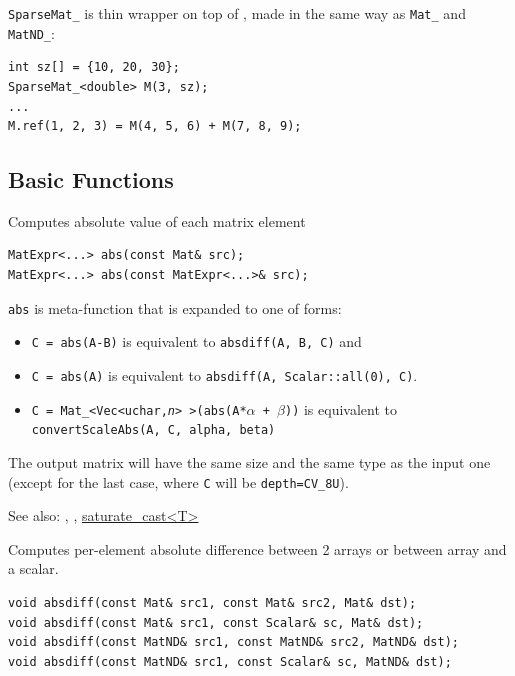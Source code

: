 \texttt{SparseMat\_} is thin wrapper on top of , made in the same way as \texttt{Mat\_} and \texttt{MatND\_}:
\begin{lstlisting}
int sz[] = {10, 20, 30};
SparseMat_<double> M(3, sz);
...
M.ref(1, 2, 3) = M(4, 5, 6) + M(7, 8, 9);
\end{lstlisting}

\subsection{Basic Functions}

\label{abs}
Computes absolute value of each matrix element

\begin{lstlisting}
MatExpr<...> abs(const Mat& src);
MatExpr<...> abs(const MatExpr<...>& src);
\end{lstlisting}
\begin{description}
\end{description}

\texttt{abs} is meta-function that is expanded to one of  forms:

\begin{itemize}
    \item \texttt{C = abs(A-B)} is equivalent to \texttt{absdiff(A, B, C)} and
    \item \texttt{C = abs(A)} is equivalent to \texttt{absdiff(A, Scalar::all(0), C)}.
    \item \texttt{C = Mat\_<Vec<uchar,\emph{n}> >(abs(A*$\alpha$ + $\beta$))} is equivalent to \texttt{convertScaleAbs(A, C, alpha, beta)}
\end{itemize}

The output matrix will have the same size and the same type as the input one
(except for the last case, where \texttt{C} will be \texttt{depth=CV\_8U}).

See also: , , \href{saturate}{saturate\_cast<T>}

\label{absdiff}
Computes per-element absolute difference between 2 arrays or between array and a scalar.

\begin{lstlisting}
void absdiff(const Mat& src1, const Mat& src2, Mat& dst);
void absdiff(const Mat& src1, const Scalar& sc, Mat& dst);
void absdiff(const MatND& src1, const MatND& src2, MatND& dst);
void absdiff(const MatND& src1, const Scalar& sc, MatND& dst);
\end{lstlisting}
\begin{description}
\end{description}

